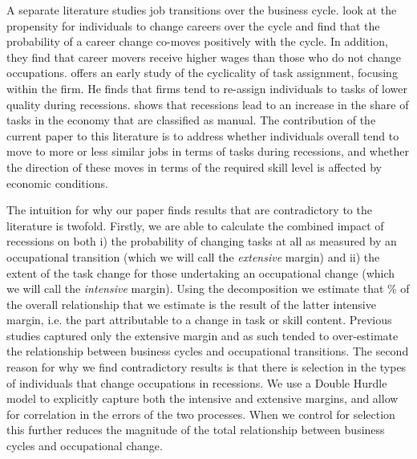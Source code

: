 \documentclass[preprint,12pt,authoryear]{elsarticle}
\begin{document}
\vspace{2mm}





\vspace{2mm}


A separate literature studies job transitions over the business cycle. \cite{Carrillo-Tudela2016} look at the propensity for individuals to change careers over the cycle and find that the probability of a career change co-moves positively with the cycle. In addition, they find that career movers receive higher wages than those who do not change occupations. \cite{Devereux2000} offers an early study of the cyclicality of task assignment, focusing within the firm. He finds that firms tend to re-assign individuals to tasks of lower quality during recessions. \cite{Summerfield2016} shows that recessions lead to an increase in the share of tasks in the economy that are classified as manual. The contribution of the current paper to this literature is to address whether individuals overall tend to move to more or less similar jobs in terms of tasks during recessions, and whether the direction of these moves in terms of the required skill level is affected by economic conditions.





\vspace{2mm}


\noindent The intuition for why our paper finds results that are contradictory to the literature is twofold.  Firstly, we are able to calculate the combined impact of recessions on both i) the probability of changing tasks at all as measured by an occupational transition (which we will call the \textit{extensive} margin) and ii) the extent of the task change for those undertaking an occupational change (which we will call the \textit{intensive} margin). Using the \cite{Mcdonald1980} decomposition we estimate that \hspace{-1mm}\% of the overall relationship that we estimate is the result of the latter intensive margin, i.e. the part attributable to a change in task or skill content. Previous studies captured only the extensive margin and as such tended to over-estimate the relationship between business cycles and occupational transitions. The second reason for why we find contradictory results is that there is selection in the types of individuals that change occupations in recessions. We use a Double Hurdle model to explicitly capture both the intensive and extensive margins, and allow for correlation in the errors of the two processes. When we control for selection this further reduces the magnitude of the total relationship between business cycles and occupational change.
\end{document}
